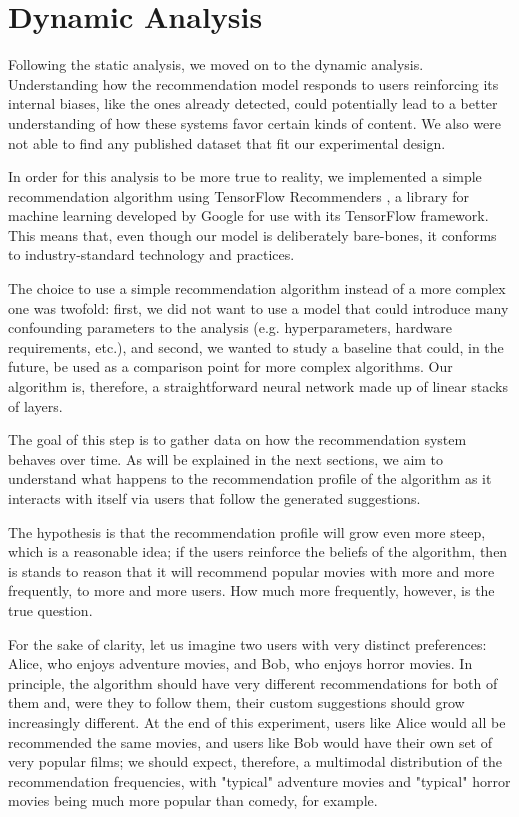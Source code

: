 
\chapter{Dynamic Analysis}
\label{cap:dynamic}

Following the static analysis, we moved on to the dynamic analysis.
Understanding how the recommendation model responds to users reinforcing its
internal biases, like the ones already detected, could potentially lead to a
better understanding of how these systems favor certain kinds of content. We
also were not able to find any published dataset that fit our experimental
design.

In order for this analysis to be more true to reality, we implemented a simple
recommendation algorithm using TensorFlow Recommenders
\citep{noauthor_tensorflow_nodate}, a library for machine learning developed by
Google for use with its TensorFlow \citep{noauthor_tensorflow_nodate-1}
framework. This means that, even though our model is deliberately bare-bones, it
conforms to industry-standard technology and practices.

The choice to use a simple recommendation algorithm instead of a more complex
one was twofold: first, we did not want to use a model that could introduce many
confounding parameters to the analysis (e.g. hyperparameters, hardware
requirements, etc.), and second, we wanted to study a baseline that could, in
the future, be used as a comparison point for more complex algorithms. Our
algorithm is, therefore, a straightforward neural network made up of linear
stacks of layers.

The goal of this step is to gather data on how the recommendation system behaves
over time. As will be explained in the next sections, we aim to understand what
happens to the recommendation profile of the algorithm as it interacts with
itself via users that follow the generated suggestions.

The hypothesis is that the recommendation profile will grow even more steep,
which is a reasonable idea; if the users reinforce the beliefs of the algorithm,
then is stands to reason that it will recommend popular movies with more and
more frequently, to more and more users. How much more frequently, however, is
the true question.

For the sake of clarity, let us imagine two users with very distinct
preferences: Alice, who enjoys adventure movies, and Bob, who enjoys horror
movies. In principle, the algorithm should have very different recommendations
for both of them and, were they to follow them, their custom suggestions should
grow increasingly different. At the end of this experiment, users like Alice
would all be recommended the same movies, and users like Bob would have their
own set of very popular films; we should expect, therefore, a multimodal
distribution of the recommendation frequencies, with "typical" adventure movies
and "typical" horror movies being much more popular than comedy, for example.

